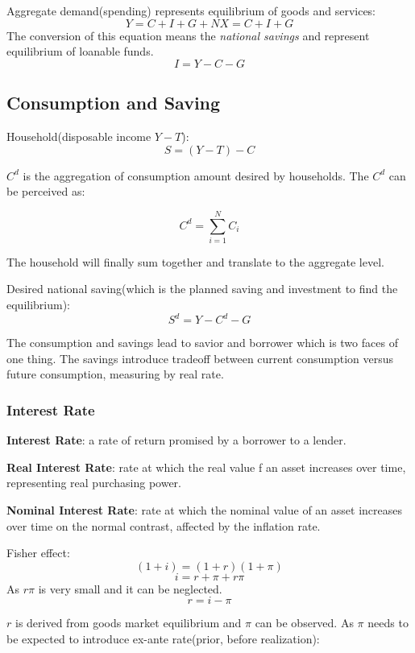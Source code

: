 \documentclass[10pt, a4paper]{article}
\begin{document}
        Aggregate demand(spending) represents equilibrium of goods and services: 
        $$Y = C + I + G + NX = C + I + G$$
        The conversion of this equation means the \emph{national savings} and represent equilibrium of loanable funds. 
        $$I = Y - C - G$$ 
        \subsection{Consumption and Saving}
            Household(disposable income $Y - T$): 
            $$S = (Y - T) - C$$

            $C^d$ is the aggregation of consumption amount desired by households. The $C^d$ can be perceived as: 
            
            $$C^d = \sum_{i = 1}^{N}C_i$$

            The household will finally sum together and translate to the aggregate level. 

            Desired national saving(which is the planned saving and investment to find the equilibrium): 
            $$S^d = Y - C^d - G$$
            
            The consumption and savings lead to savior and borrower which is two faces of one thing. The savings introduce tradeoff between current consumption versus future consumption, measuring by real rate.
            
            \subsubsection{Interest Rate}

            \textbf{Interest Rate}: a rate of return promised by a borrower to a lender. 

            \textbf{Real Interest Rate}: rate at which the real value f an asset increases over time, representing real purchasing power. 
            
            \textbf{Nominal Interest Rate}: rate at which the nominal value of an asset increases over time on the normal contrast, affected by the inflation rate. 
            
            Fisher effect: 
            $$(1 + i) = (1 + r)(1 + \pi)$$
            $$i = r +  \pi + r\pi$$
            As $r\pi$ is very small and it can be neglected. 
            $$r = i - \pi$$
            
            $r$ is derived from goods market equilibrium and $\pi$ can be observed.  As $\pi$ needs to be expected to introduce ex-ante rate(prior, before realization): 
\end{document}
